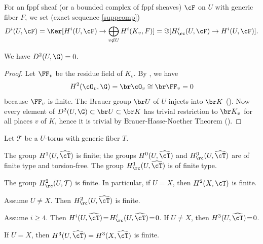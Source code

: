 For an fppf sheaf (or a bounded complex of fppf sheaves)
$\cF$ on $U$ with generic fiber $F$, we set (\cf exact
sequence \eqref{suppcomp})
\[
D^i(U,\cF)=\Ker [H^i(U, \cF) \to
\bigoplus_{v \not \in U} H^i(K_v,F)]=\Im
[H^i_\rc(U,\cF) \to H^i(U,\cF)].
\]

\begin{lem} \label{bhn}
We have $D^2(U,\G)=0$.
\end{lem}

\begin{proof} Let $\FF_v$ be the residue field of $K_v$.
By \cite[Prop.\,II.1.1\,(b)]{MilADT},
we have
\[
H^2(\cO_v,\G)=\br \cO_v \cong \br \FF_v=0
\]
because $\FF_v$ is finite.
The Brauer group $\br U$ of $U$ injects into $\br K$
(\cite[Cor.\,IV.2.6]{MilEC}). Now every element of
$D^2(U,\G) \subset \br U \subset \br K$ has trivial restriction to $\br K_v$
for all places $v$ of $K$, hence it is trivial by Brauer-Hasse-Noether
Theorem (\cite[Th.\,VIII.1.17]{nsw}).
\end{proof}

\pagebreak[2]
\begin{lem} \label{h1lem}
Let $\mathcal T$ be a $U$-torus with generic fiber $T$.
\begin{enumeratea}
\item\label{h1lema}
The group $H^1(U,\widehat\cT)$ is finite;
the groups $H^0(U,\widehat\cT)$ and $H^0_\rc(U,\widehat\cT)$
are of finite type and torsion-free. The group $H^1_\rc(U,\widehat\cT)$
is of finite type.

\item\label{h1lemb}
The group $H^2_\rc(U,\mathcal T)$ is finite. In particular, if $U=X$, then
$H^2(X,\cT)$ is finite.

\item\label{h1lemc}
Assume $U \neq X$. Then $H^2_\rc(U, \widehat \cT)$ is finite.

\item\label{h1lemd}
Assume $i \geq 4$. Then $H^i(U,\widehat \cT)\!=\!H^i_\rc(U,\widehat
\cT)\!=\!0$. If $U\!\neq\!X$,
then $H^3(U,\widehat \cT)\!=\!0$.

\item\label{h1leme}
If $U=X$, then $H^3(U,\widehat \cT)=H^3(X,\widehat \cT)$ is finite.
\end{enumeratea}
\end{lem}


